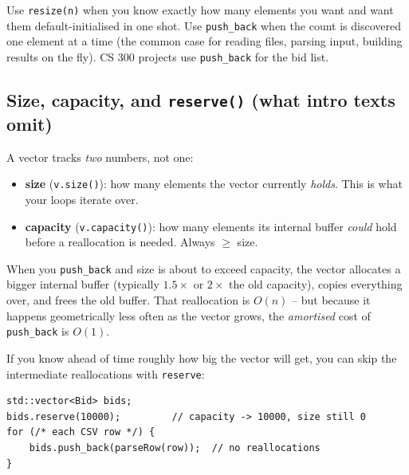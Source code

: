 \documentclass[11pt]{article}
\begin{document}
\begin{ideabox}
Use \texttt{resize(n)} when you know exactly how many elements you
want and want them default-initialised in one shot. Use
\texttt{push\_back} when the count is discovered one element at a time
(the common case for reading files, parsing input, building results
on the fly). CS 300 projects use \texttt{push\_back} for the bid list.
\end{ideabox}

\subsection{Size, capacity, and \texttt{reserve()} (what intro texts omit)}

A vector tracks \emph{two} numbers, not one:

\begin{defnbox}
\begin{itemize}
    \item \textbf{size} (\texttt{v.size()}): how many elements the
          vector currently \emph{holds}. This is what your loops
          iterate over.
    \item \textbf{capacity} (\texttt{v.capacity()}): how many elements
          its internal buffer \emph{could} hold before a reallocation
          is needed. Always $\geq$ size.
\end{itemize}
\end{defnbox}

When you \texttt{push\_back} and size is about to exceed capacity, the
vector allocates a bigger internal buffer (typically $1.5\times$ or
$2\times$ the old capacity), copies everything over, and frees the
old buffer. That reallocation is $O(n)$ -- but because it happens
geometrically less often as the vector grows, the \emph{amortised}
cost of \texttt{push\_back} is $O(1)$.

If you know ahead of time roughly how big the vector will get, you
can skip the intermediate reallocations with \texttt{reserve}:
\begin{lstlisting}
std::vector<Bid> bids;
bids.reserve(10000);         // capacity -> 10000, size still 0
for (/* each CSV row */) {
    bids.push_back(parseRow(row));  // no reallocations
}
\end{lstlisting}
\end{document}
